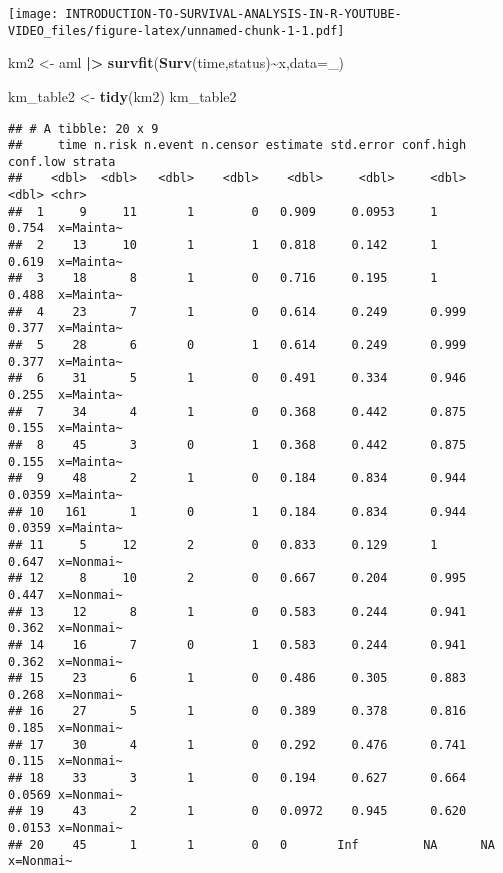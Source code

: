 \documentclass[
]{article}
\newenvironment{Shaded}{\begin{snugshade}}{\end{snugshade}}
\newcommand{\AttributeTok}[1]{\textcolor[rgb]{0.13,0.29,0.53}{#1}}
\newcommand{\FunctionTok}[1]{\textcolor[rgb]{0.13,0.29,0.53}{\textbf{#1}}}
\newcommand{\NormalTok}[1]{#1}
\newcommand{\OtherTok}[1]{\textcolor[rgb]{0.56,0.35,0.01}{#1}}
\newcommand{\SpecialCharTok}[1]{\textcolor[rgb]{0.81,0.36,0.00}{\textbf{#1}}}
\begin{document}
\texttt{[image: INTRODUCTION-TO-SURVIVAL-ANALYSIS-IN-R-YOUTUBE-VIDEO\_files/figure-latex/unnamed-chunk-1-1.pdf]}

\begin{Shaded}
\begin{Highlighting}[]
\NormalTok{km2 }\OtherTok{\textless{}{-}}\NormalTok{ aml }\SpecialCharTok{|\textgreater{}} 
  \FunctionTok{survfit}\NormalTok{(}\FunctionTok{Surv}\NormalTok{(time,status)}\SpecialCharTok{\textasciitilde{}}\NormalTok{x,}\AttributeTok{data=}\NormalTok{\_)}

\NormalTok{km\_table2 }\OtherTok{\textless{}{-}} \FunctionTok{tidy}\NormalTok{(km2)}
\NormalTok{km\_table2}
\end{Highlighting}
\end{Shaded}

\begin{verbatim}
## # A tibble: 20 x 9
##     time n.risk n.event n.censor estimate std.error conf.high conf.low strata   
##    <dbl>  <dbl>   <dbl>    <dbl>    <dbl>     <dbl>     <dbl>    <dbl> <chr>    
##  1     9     11       1        0   0.909     0.0953     1       0.754  x=Mainta~
##  2    13     10       1        1   0.818     0.142      1       0.619  x=Mainta~
##  3    18      8       1        0   0.716     0.195      1       0.488  x=Mainta~
##  4    23      7       1        0   0.614     0.249      0.999   0.377  x=Mainta~
##  5    28      6       0        1   0.614     0.249      0.999   0.377  x=Mainta~
##  6    31      5       1        0   0.491     0.334      0.946   0.255  x=Mainta~
##  7    34      4       1        0   0.368     0.442      0.875   0.155  x=Mainta~
##  8    45      3       0        1   0.368     0.442      0.875   0.155  x=Mainta~
##  9    48      2       1        0   0.184     0.834      0.944   0.0359 x=Mainta~
## 10   161      1       0        1   0.184     0.834      0.944   0.0359 x=Mainta~
## 11     5     12       2        0   0.833     0.129      1       0.647  x=Nonmai~
## 12     8     10       2        0   0.667     0.204      0.995   0.447  x=Nonmai~
## 13    12      8       1        0   0.583     0.244      0.941   0.362  x=Nonmai~
## 14    16      7       0        1   0.583     0.244      0.941   0.362  x=Nonmai~
## 15    23      6       1        0   0.486     0.305      0.883   0.268  x=Nonmai~
## 16    27      5       1        0   0.389     0.378      0.816   0.185  x=Nonmai~
## 17    30      4       1        0   0.292     0.476      0.741   0.115  x=Nonmai~
## 18    33      3       1        0   0.194     0.627      0.664   0.0569 x=Nonmai~
## 19    43      2       1        0   0.0972    0.945      0.620   0.0153 x=Nonmai~
## 20    45      1       1        0   0       Inf         NA      NA      x=Nonmai~
\end{verbatim}
\end{document}
